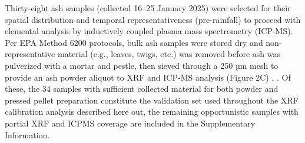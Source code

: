 \documentclass[
  journal=esthag,        %
  manuscript=article,    %
  layout=onecolumn       %
]{achemso}
\begin{document}
Thirty-eight ash samples (collected 16--25 January 2025) were selected for their spatial distribution and temporal representativeness (pre-rainfall) to proceed with elemental analysis by inductively coupled plasma mass spectrometry (ICP-MS). Per EPA Method 6200 protocols, bulk ash samples were stored dry and non-representative material (e.g., leaves, twigs, etc.) was removed before ash was pulverized with a mortar and pestle, then sieved through a 250 µm mesh to provide an ash powder aliquot to XRF and ICP-MS analysis (Figure 2C) \cite{epa6200}, \cite{epa6020b}. Of these, the 34 samples with sufficient collected material for both powder and pressed pellet preparation constitute the validation set used throughout the XRF calibration analysis described here out, the remaining opportunistic samples with partial XRF and ICPMS coverage are included in the Supplementary Information. 
\end{document}
